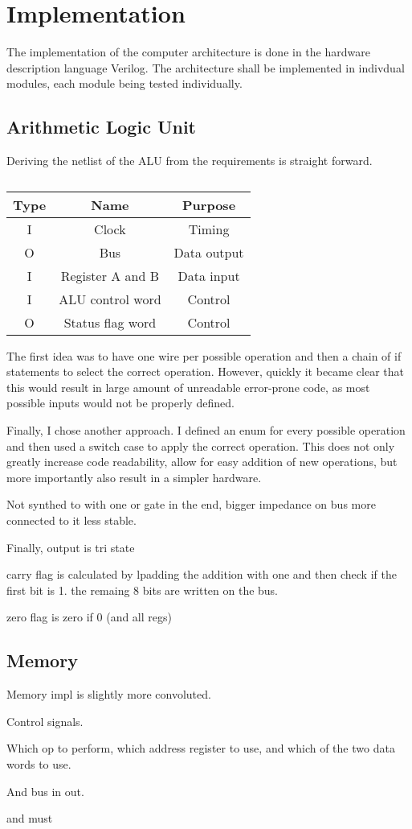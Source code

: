   \section{Implementation}
\label{sec:implementation}
The implementation of the computer architecture is done in the hardware description language Verilog. The architecture shall be implemented in indivdual modules, each module being tested individually.    

\subsection{Arithmetic Logic Unit}
Deriving the netlist of the ALU from the requirements is straight forward.

\begin{table}[H]
\begin{tabular}{ccc}
Type& Name & Purpose \\ \hline
I   & Clock & Timing \\
O   & Bus     & Data output         \\
I   & Register A and B & Data input \\
I   & ALU control word & Control \\
O   & Status flag word & Control
\end{tabular}
\caption{}
\label{tab:alu-i/o}
\end{table}

The first idea was to have one wire per possible operation and then a chain of if statements to select the correct operation. However, quickly it became clear that this would result in large amount of unreadable error-prone code, as most possible inputs would not be properly defined.

Finally, I chose another approach. I defined an enum for every possible operation and then used a switch case to apply the correct operation. This does not only greatly increase code readability, allow for easy addition of new operations, but more importantly also result in a simpler hardware. 

Not synthed to with one or gate in the end, bigger impedance on bus more connected to it less stable. 

Finally, output is tri state  

carry flag is calculated by lpadding the addition with one and then check if the first bit is 1. the remaing 8 bits are written on the bus. 

zero flag is zero if 0 (and all regs)


% 

\subsection{Memory}

Memory impl is slightly more convoluted. 

Control signals. 

Which op to perform, which address register to use, and which of the two data words to use. 

And bus in out. 

and must 


